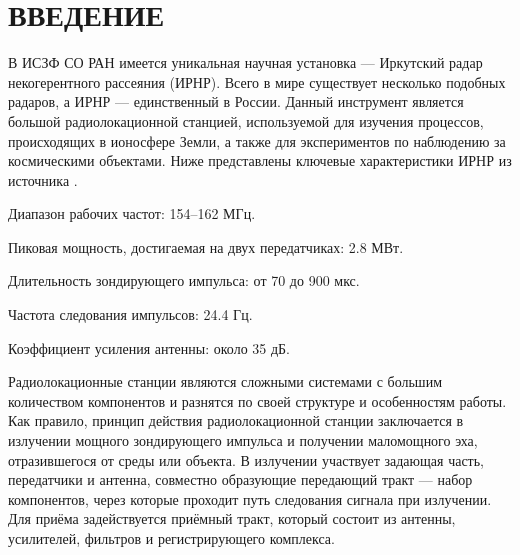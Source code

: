 \documentclass{report}
\begin{document}



\setcounter{page}{2} %
\tableofcontents  %

\setcounter{chapter}{0} %
\setcounter{section}{0} %
\setcounter{subsection}{0} %
\setcounter{equation}{0} %


\chapter*{ВВЕДЕНИЕ} %

В ИСЗФ СО РАН имеется уникальная научная установка --- Иркутский радар некогерентного рассеяния (ИРНР). Всего в мире существует несколько подобных радаров, а ИРНР --- единственный в России. Данный инструмент является большой радиолокационной станцией, используемой для изучения процессов, происходящих в ионосфере Земли, а также для экспериментов по наблюдению за космическими объектами. Ниже представлены ключевые характеристики ИРНР из источника \cite{irnr1}.

\begin{enummarker}
    \item Диапазон рабочих частот: 154--162 МГц.
    \item Пиковая мощность, достигаемая на двух передатчиках: 2.8 МВт.
    \item Длительность зондирующего импульса: от 70 до 900 мкс.
    \item Частота следования импульсов: 24.4 Гц.
    \item Коэффициент усиления антенны: около 35 дБ.
\end{enummarker}

Радиолокационные станции являются сложными системами с большим количеством компонентов и разнятся по своей структуре и особенностям работы. Как правило, принцип действия радиолокационной станции заключается в излучении мощного зондирующего импульса и получении маломощного эха, отразившегося от среды или объекта. В излучении участвует задающая часть, передатчики и антенна, совместно образующие передающий тракт --- набор компонентов, через которые проходит путь следования сигнала при излучении. Для приёма задействуется приёмный тракт, который состоит из антенны, усилителей, фильтров и регистрирующего комплекса.
\end{document}
